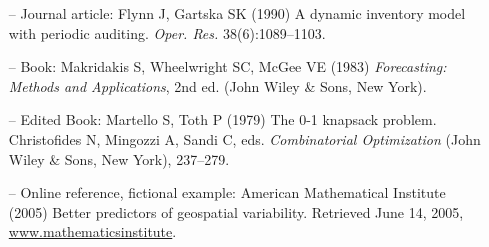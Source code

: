 \documentclass[11pt]{article}
\begin{document}
\begin{itemize}
\item[--] Journal article: Flynn J, Gartska SK (1990) A dynamic inventory model with periodic auditing. \textit{Oper. Res.} 38(6):1089--1103. 
\item[--] Book: Makridakis S, Wheelwright SC, McGee VE (1983) \textit{Forecasting: Methods and Applications}, 2nd ed. (John Wiley {\&} Sons, New York). 
\item[--] Edited Book: Martello S, Toth P (1979) The 0-1 knapsack problem. Christofides N, Mingozzi A, Sandi C, eds. \textit{Combinatorial Optimization} (John Wiley {\&} Sons, New York), 237--279.
\item[--] Online reference, fictional example: American Mathematical Institute (2005) Better predictors of geospatial variability. Retrieved June 14, 2005, \underline {www.mathematicsinstitute}.

\end{itemize}

\egroup
\end{document}
